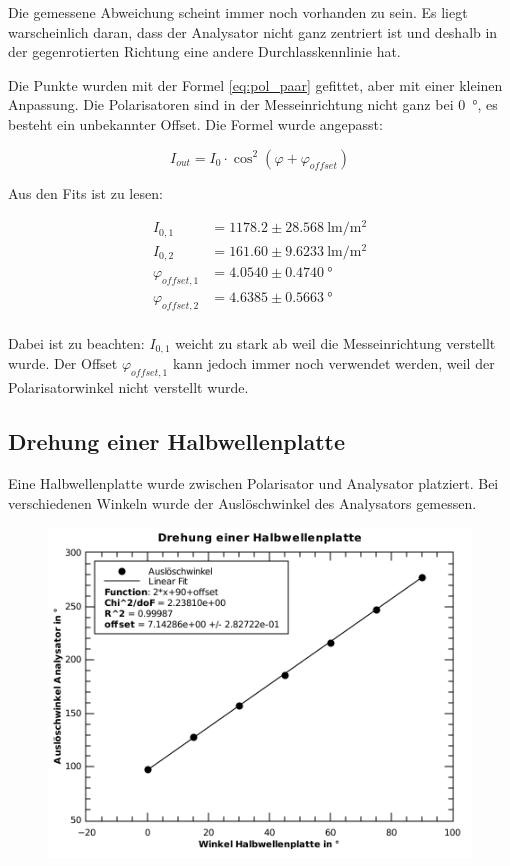 Die  gemessene  Abweichung  scheint  immer  noch  vorhanden  zu  sein.  Es liegt
warscheinlich daran, dass der Analysator nicht ganz zentriert ist und deshalb in
der gegenrotierten Richtung eine andere Durchlasskennlinie hat.

Die Punkte wurden mit der  Formel  \ref{eq:pol_paar}  gefittet,  aber  mit einer
kleinen Anpassung. Die Polarisatoren sind in der Messeinrichtung nicht ganz  bei
\SI{0}{\degree}, es besteht ein unbekannter Offset. Die Formel wurde angepasst:

\begin{equation}
    I_{out} = I_0\cdot\cos^2(\varphi + \varphi_{offset})
\end{equation}

Aus den Fits ist zu lesen:

\begin{align*}
    I_{0,1}            &= 1178.2 \pm 28.568\SI{}{\lumen\per\square\meter} \\
    I_{0,2}            &= 161.60 \pm 9.6233\SI{}{\lumen\per\square\meter} \\
    \varphi_{offset,1} &= 4.0540 \pm 0.4740\SI{}{\degree} \\
    \varphi_{offset,2} &= 4.6385 \pm 0.5663\SI{}{\degree} \\
\end{align*}

Dabei ist zu beachten: $I_{0,1}$ weicht zu stark  ab  weil  die  Messeinrichtung
verstellt  wurde.   Der  Offset  $\varphi_{offset,1}$  kann  jedoch  immer  noch
verwendet   werden,   weil   der   Polarisatorwinkel   nicht  verstellt   wurde.


\subsection{Drehung einer Halbwellenplatte}

Eine Halbwellenplatte wurde zwischen Polarisator und  Analysator  platziert. Bei
verschiedenen Winkeln  wurde  der  Ausl\"oschwinkel  des  Analysators  gemessen.

\begin{figure}[H]
    \centering
    \includegraphics[width=.6\linewidth]{images/aufgabe-4.pdf}
    \caption{}
\end{figure}

